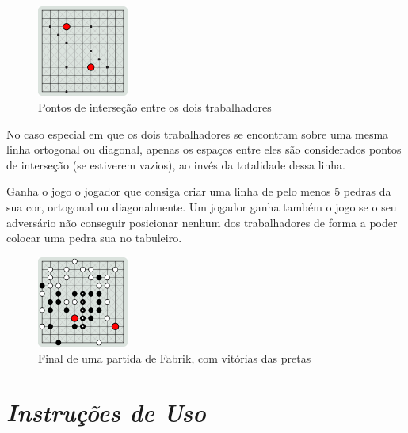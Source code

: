\documentclass[a4paper]{article}
\begin{document}
\begin{figure}[h!]
\begin{center}
\includegraphics[height=3cm,width=3cm]{images/fabrik_intersection.png}
\caption{Pontos de interseção entre os dois trabalhadores}
\label{Figura 2}
\end{center}
\end{figure}

No caso especial em que os dois trabalhadores se encontram sobre uma mesma linha ortogonal ou diagonal, apenas os espaços entre eles são considerados pontos de interseção (se estiverem vazios), ao invés da totalidade dessa linha.

Ganha o jogo o jogador que consiga criar uma linha de pelo menos 5 pedras da sua cor, ortogonal ou diagonalmente. Um jogador ganha também o jogo se o seu adversário não conseguir posicionar nenhum dos trabalhadores de forma a poder colocar uma pedra sua no tabuleiro.

\begin{figure}[h!]
\begin{center}
\includegraphics[height=3cm,width=3cm]{images/fabrik_full_board.png}
\caption{Final de uma partida de Fabrik, com vitórias das pretas}
\label{Figura 3}
\end{center}
\end{figure}

\newpage

\section{\textit{Instruções de Uso}}




\newpage
\end{document}
